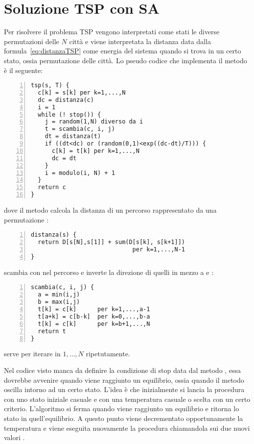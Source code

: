 \section{Soluzione \acf{TSP} con \acf{SA}}
Per risolvere il problema \ac{TSP} vengono interpretati come stati le
diverse permutazioni delle $N$ citt\`a e viene interpretata la distanza data
dalla formula~\eqref{eq:distanzaTSP} come energia del sistema quando
si trova in un certo stato, ossia permutazione delle citt\`a.
Lo pseudo codice che implementa il metodo \`e il seguente:
\begin{lstlisting}[frame=single, numbers=left]
tsp(s, T) {
  c[k] = s[k] per k=1,...,N
  dc = distanza(c)
  i = 1
  while (! stop()) {
    j = random(1,N) diverso da i
    t = scambia(c, i, j)
    dt = distanza(t)
    if ((dt<dc) or (random(0,1)<exp((dc-dt)/T))) {
      c[k] = t[k] per k=1,...,N
      dc = dt
    }
    i = modulo(i, N) + 1
  }
  return c
}
\end{lstlisting}
dove il metodo  calcola la distanza di un percorso
rappresentato da una permutazione :
\begin{lstlisting}[frame=single, numbers=left]
distanza(s) {
  return D[s[N],s[1]] + sum(D[s[k], s[k+1]])
                             per k=1,...,N-1
}
\end{lstlisting}
 scambia  con  nel
percorso  e inverte la direzione di quelli in mezzo a
 e :
\begin{lstlisting}[frame=single, numbers=left]
scambia(c, i, j) {
  a = min(i,j)
  b = max(i,j)
  t[k] = c[k]      per k=1,...,a-1
  t[a+k] = c[b-k]  per k=0,...,b-a
  t[k] = c[k]      per k=b+1,...,N
  return t
}  
\end{lstlisting}
 serve per iterare  in $1,\dots,N$
ripetutamente.

Nel codice visto manca da definire la condizione di stop
data dal metodo , essa dovrebbe avvenire quando viene
raggiunto un equilibrio, ossia quando il metodo oscilla intorno ad un
certo stato. L'idea \`e che inizialmente si lancia
la procedura con uno stato iniziale  casuale e con una
temperatura  casuale o scelta con un certo criterio. L'algoritmo si ferma
quando viene raggiunto un equilibrio e ritorna lo stato  in
quell'equilibrio. A questo punto viene decrementato opportunamente la
temperatura
 e viene eseguita nuovamente la procedura chiamandola sui due nuovi valori
.
